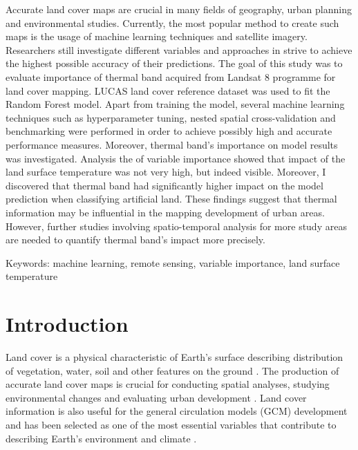 \documentclass{amuthesis}
\begin{document}
Accurate land cover maps are crucial in many fields of geography, urban
planning and environmental studies. Currently, the most popular method
to create such maps is the usage of machine learning techniques and
satellite imagery. Researchers still investigate different variables and
approaches in strive to achieve the highest possible accuracy of their
predictions. The goal of this study was to evaluate importance of
thermal band acquired from Landsat 8 programme for land cover mapping.
LUCAS land cover reference dataset was used to fit the Random Forest
model. Apart from training the model, several machine learning
techniques such as hyperparameter tuning, nested spatial
cross-validation and benchmarking were performed in order to achieve
possibly high and accurate performance measures. Moreover, thermal
band's importance on model results was investigated. Analysis the of
variable importance showed that impact of the land surface temperature
was not very high, but indeed visible. Moreover, I discovered that
thermal band had significantly higher impact on the model prediction
when classifying artificial land. These findings suggest that thermal
information may be influential in the mapping development of urban
areas. However, further studies involving spatio-temporal analysis for
more study areas are needed to quantify thermal band's impact more
precisely.

Keywords: machine learning, remote sensing, variable importance, land
surface temperature

\newpage

\sf\tighttoc\doublespacing


\hypertarget{sec-intro}{%
\chapter{Introduction}\label{sec-intro}}

Land cover is a physical characteristic of Earth's surface describing
distribution of vegetation, water, soil and other features on the ground
\autocite{rawat_monitoring_2015}. The production of accurate land cover
maps is crucial for conducting spatial analyses, studying environmental
changes \autocite{reis_analyzing_2008} and evaluating urban development
\autocite{hashem_change_2015}. Land cover information is also useful for
the general circulation models (GCM) development
\autocite{running_ecosystem_2008} and has been selected as one of the
most essential variables that contribute to describing Earth's
environment and climate \autocite{bojinski_concept_2014}.
\end{document}
